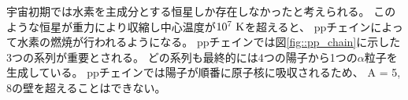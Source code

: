 宇宙初期では水素を主成分とする恒星しか存在しなかったと考えられる。
このような恒星が重力により収縮し中心温度が$10^7~{\rm K}$を超えると、
ppチェインによって水素の燃焼が行われるようになる。
ppチェインでは図\ref{fig::pp_chain}に示した3つの系列が重要とされる。
どの系列も最終的には4つの陽子から1つの$\alpha$粒子を生成している。
ppチェインでは陽子が順番に原子核に吸収されるため、
A = 5, 8の壁を超えることはできない。
